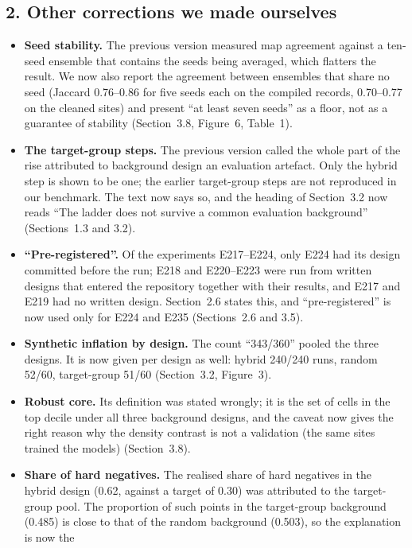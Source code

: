 \documentclass[11pt,a4paper]{article}
\begin{document}
\subsection*{2. Other corrections we made ourselves}
\begin{itemize}
  \item \textbf{Seed stability.} The previous version measured map agreement against a ten-seed ensemble that contains
        the seeds being averaged, which flatters the result. We now also report the agreement between ensembles that
        share no seed (Jaccard 0.76--0.86 for five seeds each on the compiled records, 0.70--0.77 on the cleaned
        sites) and present ``at least seven seeds'' as a floor, not as a guarantee of stability
        (Section~3.8, Figure~6, Table~1).
  \item \textbf{The target-group steps.} The previous version called the whole part of the rise attributed to
        background design an evaluation artefact. Only the hybrid step is shown to be one; the earlier target-group
        steps are not reproduced in our benchmark. The text now says so, and the heading of Section~3.2 now reads
        ``The ladder does not survive a common evaluation background'' (Sections~1.3 and 3.2).
  \item \textbf{``Pre-registered''.} Of the experiments E217--E224, only E224 had its design committed before the run;
        E218 and E220--E223 were run from written designs that entered the repository together with their results, and
        E217 and E219 had no written design. Section~2.6 states this, and ``pre-registered'' is now used only for E224
        and E235 (Sections~2.6 and 3.5).
  \item \textbf{Synthetic inflation by design.} The count ``343/360'' pooled the three designs. It is now given per
        design as well: hybrid 240/240 runs, random 52/60, target-group 51/60 (Section~3.2, Figure~3).
  \item \textbf{Robust core.} Its definition was stated wrongly; it is the set of cells in the top decile under all
        three background designs, and the caveat now gives the right reason why the density contrast is not a
        validation (the same sites trained the models) (Section~3.8).
  \item \textbf{Share of hard negatives.} The realised share of hard negatives in the hybrid design (0.62, against a
        target of 0.30) was attributed to the target-group pool. The proportion of such points in the target-group
        background (0.485) is close to that of the random background (0.503), so the explanation is now the

\end{itemize}
\end{document}
